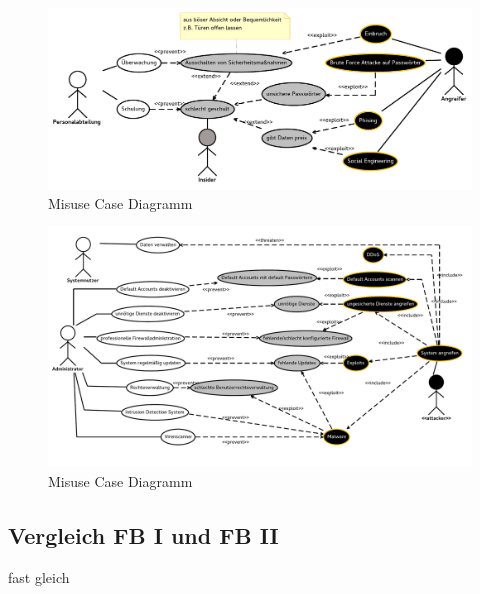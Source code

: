 \begin{figure}
\caption{Misuse Case Diagramm }
\includegraphics[scale=0.8,angle=90]{images/Schulung.pdf} 
\end{figure}

\begin{figure}
\caption{Misuse Case Diagramm }
\includegraphics[scale=0.8,angle=90]{images/Server.pdf} 
\end{figure}






\subsection{Vergleich FB I und FB II}

fast gleich